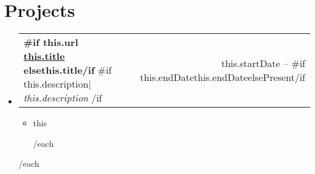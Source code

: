 \documentclass[letterpaper,11pt]{article}
\makeatletter
\newcommand{\resumeItem}[1]{
  \item\small{
    {#1 \vspace{-2pt}}
  }
}
\newcommand{\resumeProjectHeading}[2]{
    \item
    \begin{tabular*}{0.97\textwidth}{l@{\extracolsep{\fill}}r}
      \small#1 & #2 \\
    \end{tabular*}\vspace{-7pt}
}
\newcommand{\resumeSubHeadingListStart}{\begin{itemize}[leftmargin=0.15in, label={}]}
\newcommand{\resumeSubHeadingListEnd}{\end{itemize}}
\newcommand{\resumeItemListStart}{\begin{itemize}}
\newcommand{\resumeItemListEnd}{\end{itemize}\vspace{-5pt}}
\makeatother
\begin{document}
\section{Projects}
    \resumeSubHeadingListStart
    {{#each projects}}
      \resumeProjectHeading
        { \textbf{ {{#if this.url}} \href{ {{this.url}} }{ {{this.title}} } {{else}}{{this.title}}{{/if}} }{{#if this.description}}$|$\emph{ {{this.description}} } {{/if}} }{ {{this.startDate}} -- {{#if this.endDate}}{{this.endDate}}{{else}}Present{{/if}} }
          \resumeItemListStart
            {{#each this.responsibilities}}
              \resumeItem{ {{this}} }
            {{/each}}
          \resumeItemListEnd
    {{/each}}
    \resumeSubHeadingListEnd
\end{document}
